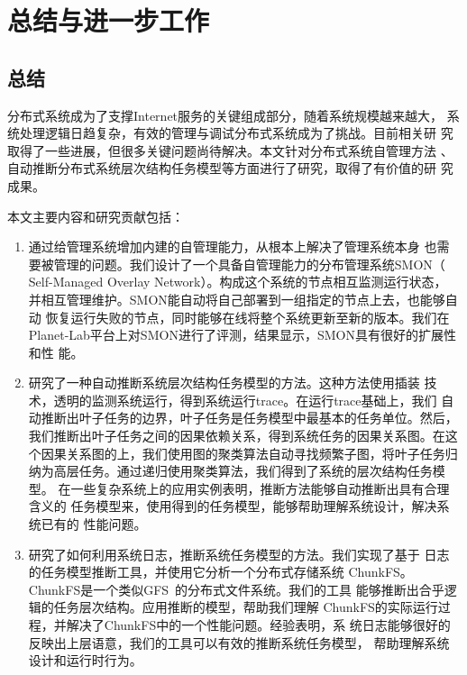 \chapter{总结与进一步工作}
\label{chap:conclusion}

\section{总结}

分布式系统成为了支撑Internet服务的关键组成部分，随着系统规模越来越大，
系统处理逻辑日趋复杂，有效的管理与调试分布式系统成为了挑战。目前相关研
究取得了一些进展，但很多关键问题尚待解决。本文针对分布式系统自管理方法
、自动推断分布式系统层次结构任务模型等方面进行了研究，取得了有价值的研
究成果。

本文主要内容和研究贡献包括：

\begin{enumerate}
  
  \item 通过给管理系统增加内建的自管理能力，从根本上解决了管理系统本身
  也需要被管理的问题。我们设计了一个具备自管理能力的分布管理系统SMON（
  Self-Managed Overlay Network）。构成这个系统的节点相互监测运行状态，
  并相互管理维护。SMON能自动将自己部署到一组指定的节点上去，也能够自动
  恢复运行失败的节点，同时能够在线将整个系统更新至新的版本。我们在
  Planet-Lab平台上对SMON进行了评测，结果显示，SMON具有很好的扩展性和性
  能。

  \item 研究了一种自动推断系统层次结构任务模型的方法。这种方法使用插装
  技术，透明的监测系统运行，得到系统运行trace。在运行trace基础上，我们
  自动推断出叶子任务的边界，叶子任务是任务模型中最基本的任务单位。然后，
  我们推断出叶子任务之间的因果依赖关系，得到系统任务的因果关系图。在这
  个因果关系图的上，我们使用图的聚类算法自动寻找频繁子图，将叶子任务归
  纳为高层任务。通过递归使用聚类算法，我们得到了系统的层次结构任务模型。
  在一些复杂系统上的应用实例表明，推断方法能够自动推断出具有合理含义的
  任务模型来，使用得到的任务模型，能够帮助理解系统设计，解决系统已有的
  性能问题。

  \item 研究了如何利用系统日志，推断系统任务模型的方法。我们实现了基于
  日志的任务模型推断工具，并使用它分析一个分布式存储系统
  ChunkFS。ChunkFS是一个类似GFS~\cite{gfs}的分布式文件系统。我们的工具
  能够推断出合乎逻辑的任务层次结构。应用推断的模型，帮助我们理解
  ChunkFS的实际运行过程，并解决了ChunkFS中的一个性能问题。经验表明，系
  统日志能够很好的反映出上层语意，我们的工具可以有效的推断系统任务模型，
  帮助理解系统设计和运行时行为。

\end{enumerate}

